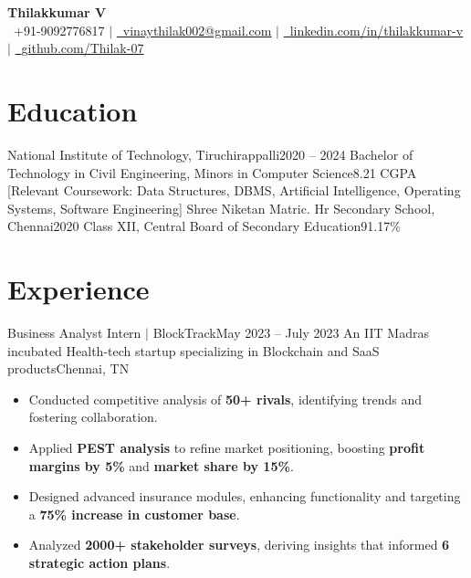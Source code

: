 \documentclass[letterpaper,11pt]{article}
\newcommand{\resumeItem}[1]{
  \item\small{
    {#1 \vspace{-2pt}}
  }
}
\newcommand{\resumeSubHeadingListStart}{\begin{itemize}[leftmargin=0.15in, label={}]}
\newcommand{\resumeSubHeadingListEnd}{\end{itemize}}
\newcommand{\resumeItemListStart}{\begin{itemize}}
\newcommand{\resumeItemListEnd}{\end{itemize}\vspace{-5pt}}
\begin{document}
\begin{center}
    \textbf{\Huge Thilakkumar V} \\ \vspace{2pt}
    {\raisebox{0.0\height}{\footnotesize \faPhone}\
    \footnotesize +91-9092776817} $|$
    \href{mailto:vinaythilak002@gmail.com}
    {\raisebox{-0.1\height}{\footnotesize \faEnvelope}\
    \footnotesize \underline{vinaythilak002@gmail.com}} $|$ 
    \href{https://www.linkedin.com/in/thilakkumar-v-65610a200/}
    {\raisebox{-0.1\height}{\footnotesize \faLinkedin}\
    \footnotesize \underline{linkedin.com/in/thilakkumar-v}} $|$
    \href{https://github.com/Thilak-07}
    {\raisebox{-0.1\height}{\footnotesize \faGithub}\
    \footnotesize \underline{github.com/Thilak-07}}
\end{center}


\section{Education}
  \resumeSubHeadingListStart
    \resumeSubheading
      {National Institute of Technology, Tiruchirappalli}{2020 -- 2024}
      {Bachelor of Technology in Civil Engineering, Minors in Computer Science}{8.21 CGPA}
      [Relevant Coursework: Data Structures, DBMS, Artificial Intelligence, Operating Systems, Software Engineering]
    \vspace{-2pt}
    \resumeSubheading
      {Shree Niketan Matric. Hr Secondary School, Chennai}{2020}
      {Class XII, Central Board of Secondary Education}{91.17\%}
  \resumeSubHeadingListEnd \vspace{-5pt}


\section{Experience}
  \resumeSubHeadingListStart
    \resumeSubheading
      {{Business Analyst Intern} $|$ {BlockTrack}}{May 2023 -- July 2023}
      {An IIT Madras incubated Health-tech startup specializing in Blockchain and SaaS products}{Chennai, TN}
      \resumeItemListStart
        \resumeItem{Conducted competitive analysis of \textbf{50+ rivals}, identifying trends and fostering collaboration.}
        \resumeItem{Applied \textbf{PEST analysis} to refine market positioning, boosting \textbf{profit margins by 5\%} and \textbf{market share by 15\%}.}
        \resumeItem{Designed advanced insurance modules, enhancing functionality and targeting a \textbf{75\% increase in customer base}.}
        \resumeItem{Analyzed \textbf{2000+ stakeholder surveys}, deriving insights that informed \textbf{6 strategic action plans}.}
      \resumeItemListEnd
  \resumeSubHeadingListEnd
\end{document}

